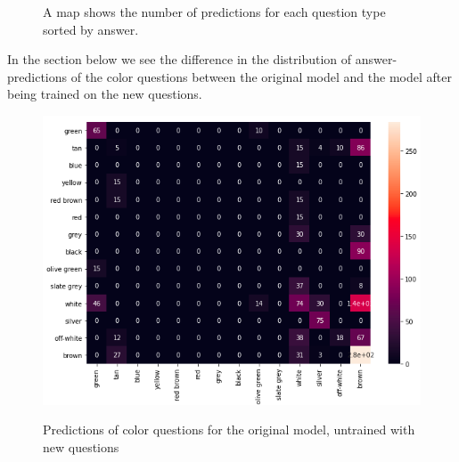 \begin{figure}[H]
 \centering
{}

\caption{A map shows the number of predictions for each question type sorted by answer.}
\end{figure}




In the section below we see the difference in the distribution of answer-predictions of the color questions between the original model and the model after being trained on the new questions. 

\begin{figure}[H]
\includegraphics[scale=0.45]{images/Heatmapbefore.png}
\label{fig:Heatmapbefore}
\caption{Predictions of color questions for the original model, untrained with new questions}
\end{figure}

